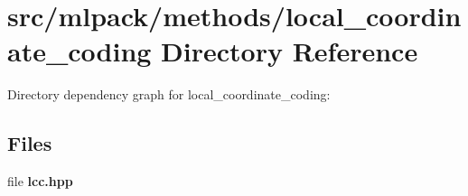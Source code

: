 \section{src/mlpack/methods/local\-\_\-coordinate\-\_\-coding Directory Reference}
\label{dir_e025bff8b80dd0d2c68befe3fb225c4d}
Directory dependency graph for local\-\_\-coordinate\-\_\-coding\-:
\subsection*{Files}
\begin{DoxyCompactItemize}
\item 
file {\bf lcc.\-hpp}
\end{DoxyCompactItemize}
